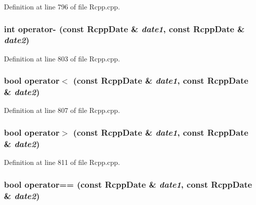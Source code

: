Definition at line 796 of file Rcpp.cpp.\hypertarget{classRcppDate_49241820910c75948937f70f76c0849d}{
\subsubsection[operator-]{\setlength{\rightskip}{0pt plus 5cm}int operator- (const {\bf RcppDate} \& {\em date1}, \/  const {\bf RcppDate} \& {\em date2})}}
\label{classRcppDate_49241820910c75948937f70f76c0849d}




Definition at line 803 of file Rcpp.cpp.\hypertarget{classRcppDate_f852d3a1ad52776201f385be5ea18c71}{
\subsubsection[operator$<$]{\setlength{\rightskip}{0pt plus 5cm}bool operator$<$ (const {\bf RcppDate} \& {\em date1}, \/  const {\bf RcppDate} \& {\em date2})}}
\label{classRcppDate_f852d3a1ad52776201f385be5ea18c71}




Definition at line 807 of file Rcpp.cpp.\hypertarget{classRcppDate_80164a177c098301c1d509fdab702567}{
\subsubsection[operator$>$]{\setlength{\rightskip}{0pt plus 5cm}bool operator$>$ (const {\bf RcppDate} \& {\em date1}, \/  const {\bf RcppDate} \& {\em date2})}}
\label{classRcppDate_80164a177c098301c1d509fdab702567}




Definition at line 811 of file Rcpp.cpp.\hypertarget{classRcppDate_d6c1518c6eb9480665f532dbcc6dd2d5}{
\subsubsection[operator==]{\setlength{\rightskip}{0pt plus 5cm}bool operator== (const {\bf RcppDate} \& {\em date1}, \/  const {\bf RcppDate} \& {\em date2})}}
\label{classRcppDate_d6c1518c6eb9480665f532dbcc6dd2d5}




